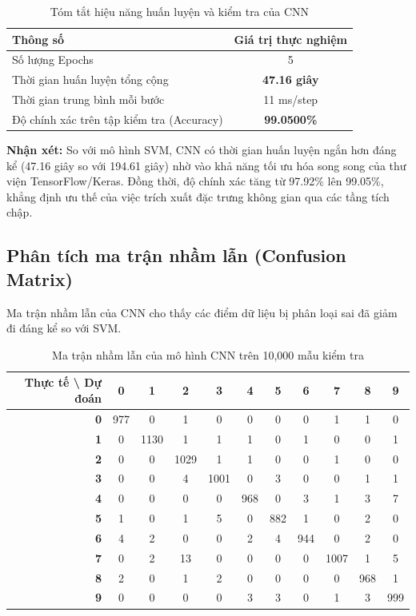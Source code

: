 \documentclass[../DoAn.tex]{subfiles}
\begin{document}
\begin{table}[H]
\centering
\caption{Tóm tắt hiệu năng huấn luyện và kiểm tra của CNN}
\label{tab:cnn_general_perf}
\begin{tabular}{|l|c|}
\hline
\textbf{Thông số} & \textbf{Giá trị thực nghiệm} \\ \hline
Số lượng Epochs & 5 \\ \hline
Thời gian huấn luyện tổng cộng & \textbf{47.16 giây} \\ \hline
Thời gian trung bình mỗi bước & 11 ms/step \\ \hline
Độ chính xác trên tập kiểm tra (Accuracy) & \textbf{99.0500\%} \\ \hline
\end{tabular}
\end{table}

\textbf{Nhận xét:} So với mô hình SVM, CNN có thời gian huấn luyện ngắn hơn đáng kể (47.16 giây so với 194.61 giây) nhờ vào khả năng tối ưu hóa song song của thư viện TensorFlow/Keras. Đồng thời, độ chính xác tăng từ 97.92\% lên 99.05\%, khẳng định ưu thế của việc trích xuất đặc trưng không gian qua các tầng tích chập.

\subsection{Phân tích ma trận nhầm lẫn (Confusion Matrix)}

Ma trận nhầm lẫn của CNN cho thấy các điểm dữ liệu bị phân loại sai đã giảm đi đáng kể so với SVM.

\begin{table}[H]
\centering
\small
\caption{Ma trận nhầm lẫn của mô hình CNN trên 10,000 mẫu kiểm tra}
\label{tab:cnn_cm}
\begin{tabular}{r|cccccccccc}
\hline
\textbf{Thực tế \textbackslash{} Dự đoán} & \textbf{0} & \textbf{1} & \textbf{2} & \textbf{3} & \textbf{4} & \textbf{5} & \textbf{6} & \textbf{7} & \textbf{8} & \textbf{9} \\ \hline
\textbf{0} & 977 & 0   & 1   & 0   & 0   & 0   & 0   & 1   & 1   & 0   \\
\textbf{1} & 0   & 1130 & 1   & 1   & 1   & 0   & 1   & 0   & 0   & 1   \\
\textbf{2} & 0   & 0   & 1029 & 1   & 1   & 0   & 0   & 1   & 0   & 0   \\
\textbf{3} & 0   & 0   & 4   & 1001 & 0   & 3   & 0   & 0   & 1   & 1   \\
\textbf{4} & 0   & 0   & 0   & 0   & 968 & 0   & 3   & 1   & 3   & 7   \\
\textbf{5} & 1   & 0   & 1   & 5   & 0   & 882 & 1   & 0   & 2   & 0   \\
\textbf{6} & 4   & 2   & 0   & 0   & 2   & 4   & 944 & 0   & 2   & 0   \\
\textbf{7} & 0   & 2   & 13  & 0   & 0   & 0   & 0   & 1007 & 1   & 5   \\
\textbf{8} & 2   & 0   & 1   & 2   & 0   & 0   & 0   & 0   & 968 & 1   \\
\textbf{9} & 0   & 0   & 0   & 0   & 3   & 3   & 0   & 1   & 3   & 999 \\ \hline
\end{tabular}
\end{table}
\end{document}
